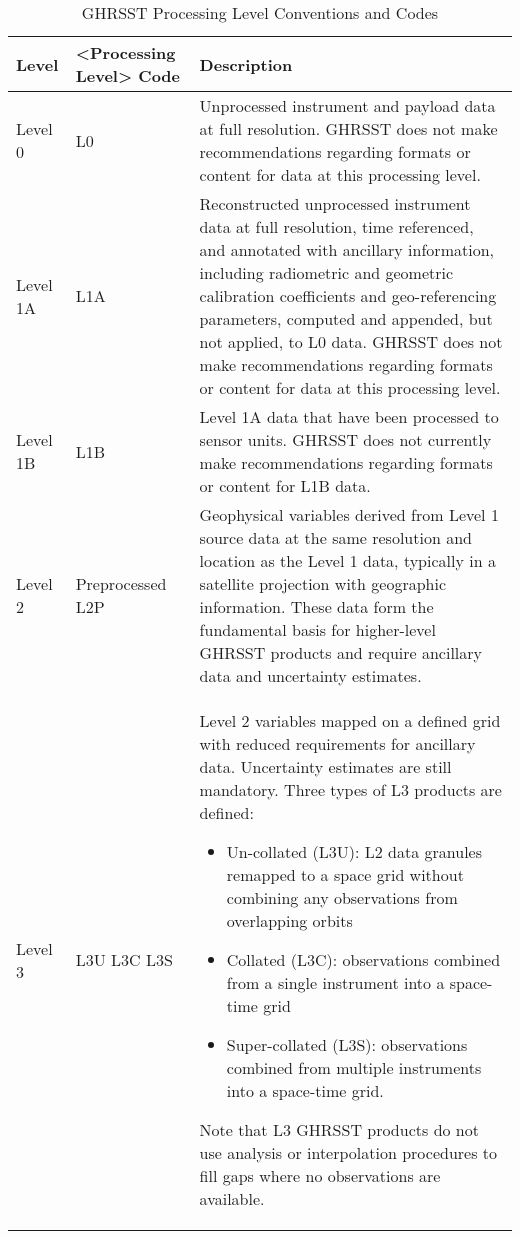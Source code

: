 \begin{table}[h]
\caption{GHRSST Processing Level Conventions and Codes}
\label{tab:GHRSST Processing Level Conventions and Codes}
\begin{tabular}{|p{}|p{}|p{}|}
\hline
\rowcolor{lightgray}
\textbf{Level} & \textbf{<Processing Level> Code} & \textbf{Description} \\ \hline

Level 0 & L0 &
Unprocessed instrument and payload data at full resolution. GHRSST
does not make recommendations regarding formats or content for data
at this processing level. \\ \hline

Level 1A & L1A & 
Reconstructed unprocessed instrument data at full resolution, time
referenced, and annotated with ancillary information, including
radiometric and geometric calibration coefficients and geo-referencing
parameters, computed and appended, but not applied, to L0 data.
GHRSST does not make recommendations regarding formats or
content for data at this processing level. \\ \hline

Level 1B & L1B & 
Level 1A data that have been processed to sensor units. GHRSST
does not currently make recommendations regarding formats or content
for L1B data. \\ \hline

Level 2 & Preprocessed L2P &
Geophysical variables derived from Level 1 source data at the same
resolution and location as the Level 1 data, typically in a satellite
projection with geographic information. These data form the
fundamental basis for higher-level GHRSST products and require
ancillary data and uncertainty estimates. \\ \hline

Level 3 & L3U L3C L3S & Level 2 variables mapped on a defined grid with reduced requirements for ancillary data. 
Uncertainty estimates are still mandatory. Three
types of L3 products are defined:
\begin{itemize}
\item{Un-collated (L3U): L2 data granules remapped to a space grid without combining any observations from overlapping orbits}
\item {Collated (L3C): observations combined from a single instrument into a space-time grid}
\item {Super-collated (L3S): observations combined from multiple instruments into a space-time grid.}
\end{itemize}
Note that L3 GHRSST products do not use analysis or interpolation
procedures to fill gaps where no observations are available. \\ \hline


\end{tabular}
\end{table}
